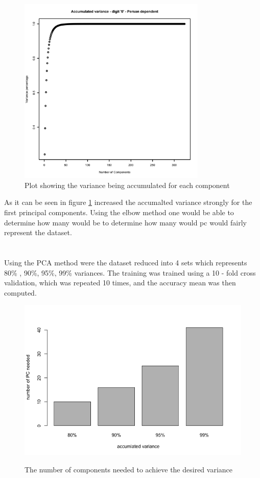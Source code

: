 \begin{figure}[H]
\centering
\includegraphics[width = 0.8\textwidth]{graphics/accumulated-2-1-person-dependent.png}
\caption{Plot showing the variance being accumulated for each component}
\label{fig:PCa_num_comp}
\end{figure}

As it can be seen in figure \ref{fig:PCa_num_comp} increased the accumalted variance strongly for the first principal components.  Using the elbow method one would be able to determine how many would be to determine how many would pc would fairly represent the dataset. 
\\
\\
\\
Using the PCA method were the dataset reduced into 4 sets  which represents 80\% , 90\%, 95\%, 99\% variances. The training was trained using a 10 - fold cross validation, which was repeated 10 times, and the accuracy mean was then computed. 

\begin{figure}[H]
\centering
\includegraphics[width = \textwidth]{graphics/PCA_barplot.png}
\label{fig:pca_comp}
\caption{The number of components needed to achieve the desired variance}
\end{figure}

